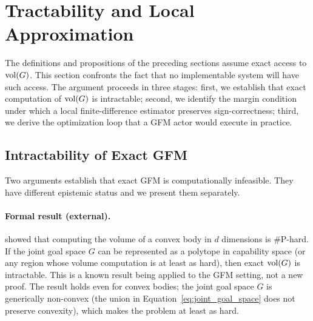 %
%

\section{Tractability and Local Approximation}
\label{sec:tractability}

The definitions and propositions of the preceding sections assume exact access
to $\operatorname{vol}(G)$. This section confronts the fact that no implementable system will
have such access. The argument proceeds in three stages: first, we establish
that exact computation of $\operatorname{vol}(G)$ is intractable; second, we identify the
margin condition under which a local finite-difference estimator preserves
sign-correctness; third, we derive the optimization loop that a GFM actor would
execute in practice.


\subsection{Intractability of Exact GFM}

Two arguments establish that exact GFM is computationally infeasible. They have
different epistemic status and we present them separately.

\paragraph{Formal result (external).} \citet{dyer1988complexity} showed that
computing the volume of a convex body in $d$ dimensions is \#P-hard. If the
joint goal space $G$ can be represented as a polytope in capability space (or
any region whose volume computation is at least as hard), then exact $\operatorname{vol}(G)$
is intractable. This is a known result being applied to the GFM setting, not a
new proof. The result holds even for convex bodies; the joint goal space $G$ is
generically non-convex (the union in Equation~\eqref{eq:joint_goal_space} does
not preserve convexity), which makes the problem at least as hard.

